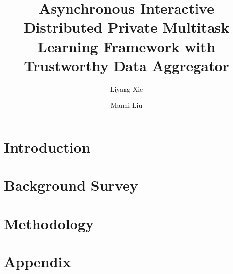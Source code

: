 \documentclass[11pt,twocolumn,letterpaper]{article}
\begin{document}
\title{Asynchronous Interactive Distributed Private Multitask Learning Framework with Trustworthy Data Aggregator}

\author{Liyang Xie\\
\and
Manni Liu\\
}

\maketitle

\begin{abstract}

\end{abstract}

\section{Introduction}


\section{Background Survey}


\section{Methodology}


% 

\section{Appendix}


{\small


}
\end{document}
